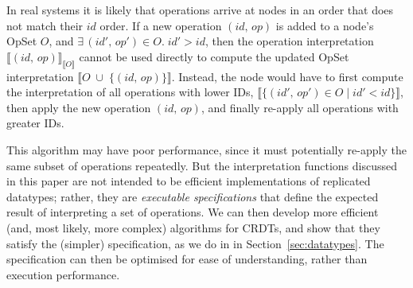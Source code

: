 In real systems it is likely that operations arrive at nodes in an order that does not match their $\mathit{id}$ order.
If a new operation $(\mathit{id},\, \mathit{op})$ is added to a node's OpSet $O$, and $\exists\,(\mathit{id}',\, \mathit{op}') \in O.\; \mathit{id}' > \mathit{id}$,
then the operation interpretation $\llbracket (\mathit{id},\, \mathit{op}) \rrbracket_{\llbracket O \rrbracket}$ cannot be used directly to compute the updated OpSet interpretation
$\llbracket O \;\cup\; \{(\mathit{id},\, \mathit{op})\} \rrbracket$.
Instead, the node would have to first compute the interpretation of all operations with lower IDs,
$\llbracket \{(\mathit{id}',\, \mathit{op}') \in O \mid \mathit{id}' < \mathit{id}\} \rrbracket$,
then apply the new operation $(\mathit{id},\, \mathit{op})$, and finally re-apply all operations with greater IDs.

This algorithm may have poor performance, since it must potentially re-apply the same subset of operations repeatedly.
But the interpretation functions discussed in this paper are not intended to be efficient implementations of replicated datatypes; rather, they are \emph{executable specifications} that define the expected result of interpreting a set of operations.
We can then develop more efficient (and, most likely, more complex) algorithms for CRDTs, and show that they satisfy the (simpler) specification, as we do in in Section~\ref{sec:datatypes}.
The specification can then be optimised for ease of understanding, rather than execution performance.

